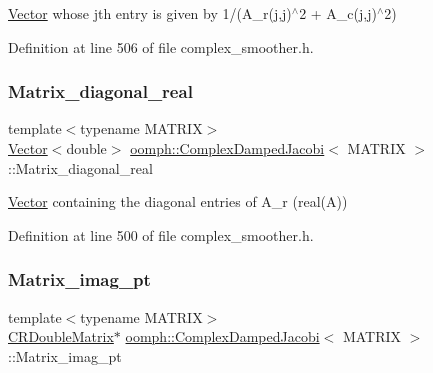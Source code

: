 \hyperlink{classoomph_1_1Vector}{Vector} whose j\textquotesingle{}th entry is given by 1/(A\+\_\+r(j,j)$^\wedge$2 + A\+\_\+c(j,j)$^\wedge$2) 



Definition at line 506 of file complex\+\_\+smoother.\+h.

\mbox{\label{classoomph_1_1ComplexDampedJacobi_a5f8a5cd7da48fc81c9224c2c0a6d509e}} 
\subsubsection{\texorpdfstring{Matrix\+\_\+diagonal\+\_\+real}{Matrix\_diagonal\_real}}
{\footnotesize\ttfamily template$<$typename M\+A\+T\+R\+IX$>$ \\
\hyperlink{classoomph_1_1Vector}{Vector}$<$double$>$ \hyperlink{classoomph_1_1ComplexDampedJacobi}{oomph\+::\+Complex\+Damped\+Jacobi}$<$ M\+A\+T\+R\+IX $>$\+::Matrix\+\_\+diagonal\+\_\+real\hspace{0.3cm}{\ttfamily [private]}}



\hyperlink{classoomph_1_1Vector}{Vector} containing the diagonal entries of A\+\_\+r (real(\+A)) 



Definition at line 500 of file complex\+\_\+smoother.\+h.

\mbox{\label{classoomph_1_1ComplexDampedJacobi_a6f1e4350f4e9075d1bcb0fa518ffc0ea}} 
\subsubsection{\texorpdfstring{Matrix\+\_\+imag\+\_\+pt}{Matrix\_imag\_pt}}
{\footnotesize\ttfamily template$<$typename M\+A\+T\+R\+IX$>$ \\
\hyperlink{classoomph_1_1CRDoubleMatrix}{C\+R\+Double\+Matrix}$\ast$ \hyperlink{classoomph_1_1ComplexDampedJacobi}{oomph\+::\+Complex\+Damped\+Jacobi}$<$ M\+A\+T\+R\+IX $>$\+::Matrix\+\_\+imag\+\_\+pt\hspace{0.3cm}{\ttfamily [private]}}



